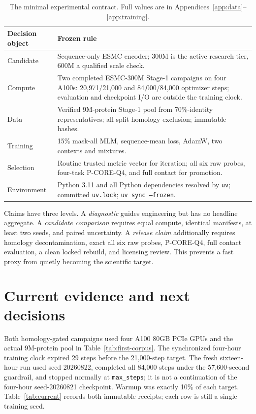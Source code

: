 \documentclass{article}
\newcommand{\code}[1]{\texttt{#1}}
\begin{document}
\begin{table}[H]
  \centering
  \small
  \setlength{\tabcolsep}{4pt}
  \begin{tabularx}{\textwidth}{@{}p{}Y@{}}
    \toprule
    Decision object & Frozen rule \\
    \midrule
    Candidate & Sequence-only ESMC encoder; 300M is the active research tier, 600M a qualified scale check. \\
    Compute & Two completed ESMC-300M Stage-1 campaigns on four A100s: 20,971/21,000 and 84,000/84,000 optimizer steps; evaluation and checkpoint I/O are outside the training clock. \\
    Data & Verified 9M-protein Stage-1 pool from 70\%-identity representatives; all-split homology exclusion; immutable hashes. \\
    Training & 15\% mask-all MLM, sequence-mean loss, AdamW, two contexts and mixtures. \\
    Selection & Routine trusted metric vector for iteration; all six raw probes, four-task P-CORE-Q4, and full contact for promotion. \\
    Environment & Python 3.11 and all Python dependencies resolved by \texttt{uv}; committed \code{uv.lock}; \code{uv sync --frozen}. \\
    \bottomrule
  \end{tabularx}
  \caption{The minimal experimental contract. Full values are in Appendices~\ref{app:data}--\ref{app:training}.}
  \label{tab:contract}
\end{table}

Claims have three levels. A \emph{diagnostic} guides engineering but has no
headline aggregate. A \emph{candidate comparison} requires equal compute,
identical manifests, at least two seeds, and paired uncertainty. A
\emph{release claim} additionally requires homology decontamination, exact
all six raw probes, P-CORE-Q4, full contact evaluation, a clean locked rebuild,
and licensing review.
This prevents a fast proxy from quietly becoming the scientific target.

\section{Current evidence and next decisions}

Both homology-gated campaigns used four A100 80GB PCIe GPUs and the actual
9M-protein pool in Table~\ref{tab:first-corpus}. The synchronized four-hour
training clock expired 29 steps before the 21,000-step target. The fresh
sixteen-hour run used seed 20260822, completed all 84,000 steps under the
57,600-second guardrail, and stopped normally at \code{max\_steps}; it is not a
continuation of the four-hour seed-20260821 checkpoint. Warmup was exactly
10\% of each target. Table~\ref{tab:current} records both immutable receipts;
each row is still a single training seed.
\end{document}
